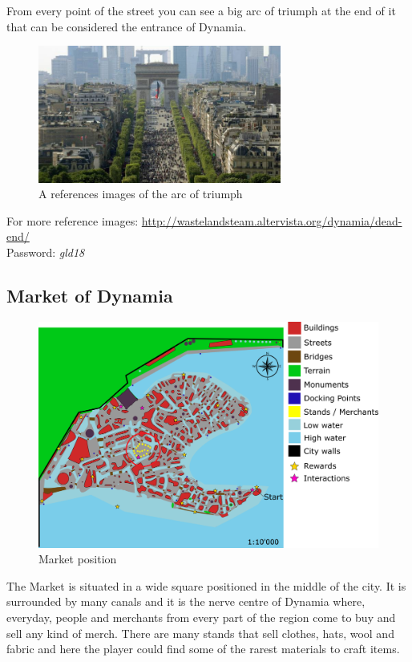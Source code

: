 From every point of the street you can see a big arc of triumph at the end of it that can be considered the entrance of Dynamia.

\begin{figure}[H]
  \centering
  \includegraphics[width=8cm]{Images/Landmarks/arcOfTriumph}
  \caption{A references images of the arc of triumph}
\end{figure}

For more reference images: \url{http://wastelandsteam.altervista.org/dynamia/dead-end/}\\
Password: \textit{gld18}

\subsection{Market of Dynamia}
\begin{figure}[H]
  \centering
  \includegraphics[width=\textwidth]{Images/Maps/dynamia_market}
  \caption{Market position}
\end{figure}

The Market is situated in a wide square positioned in the middle of the city. It is surrounded by many canals and it is the nerve centre of Dynamia where, everyday, people and merchants from every part of the region come to buy and sell any kind of merch. There are many stands that sell clothes, hats, wool and fabric and here the player could find some of the rarest materials to craft items.

